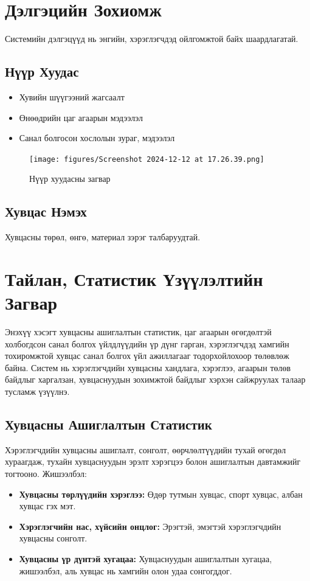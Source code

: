 \section{Дэлгэцийн Зохиомж}
Системийн дэлгэцүүд нь энгийн, хэрэглэгчдэд ойлгомжтой байх шаардлагатай. 

\subsection{Нүүр Хуудас}
\begin{itemize}
    \item Хувийн шүүгээний жагсаалт
    \item Өнөөдрийн цаг агаарын мэдээлэл
    \item Санал болгосон хослолын зураг, мэдээлэл
\end{itemize}

\begin{figure}[h!]
    \centering
    \texttt{[image: figures/Screenshot 2024-12-12 at 17.26.39.png]}
    \caption{Нүүр хуудасны загвар}
    \label{fig:homepage-design}
\end{figure}

\subsection{Хувцас Нэмэх}
Хувцасны төрөл, өнгө, материал зэрэг талбаруудтай.

\section{Тайлан, Статистик Үзүүлэлтийн Загвар}

Энэхүү хэсэгт хувцасны ашиглалтын статистик, цаг агаарын өгөгдөлтэй холбогдсон санал болгох үйлдлүүдийн үр дүнг гарган, хэрэглэгчдэд хамгийн тохиромжтой хувцас санал болгох үйл ажиллагааг тодорхойлохоор төлөвлөж байна. Систем нь хэрэглэгчдийн хувцасны хандлага, хэрэглээ, агаарын төлөв байдлыг харгалзан, хувцаснуудын зохимжтой байдлыг хэрхэн сайжруулах талаар тусламж үзүүлнэ.

\subsection{Хувцасны Ашиглалтын Статистик}
Хэрэглэгчдийн хувцасны ашиглалт, сонголт, өөрчлөлтүүдийн тухай өгөгдөл хураагдаж, тухайн хувцаснуудын эрэлт хэрэгцээ болон ашиглалтын давтамжийг тогтооно. Жишээлбэл:
\begin{itemize}
    \item \textbf{Хувцасны төрлүүдийн хэрэглээ:} Өдөр тутмын хувцас, спорт хувцас, албан хувцас гэх мэт.
    \item \textbf{Хэрэглэгчийн нас, хүйсийн онцлог:} Эрэгтэй, эмэгтэй хэрэглэгчдийн хувцасны сонголт.
    \item \textbf{Хувцасны үр дүнтэй хугацаа:} Хувцаснуудын ашиглалтын хугацаа, жишээлбэл, аль хувцас нь хамгийн олон удаа сонгогддог.
\end{itemize}

